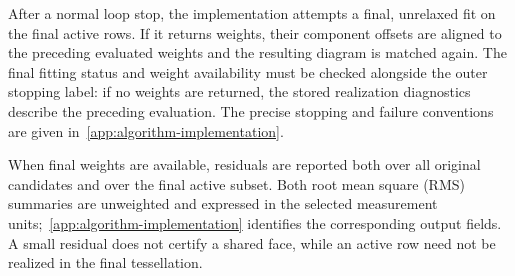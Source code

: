 After a normal loop stop, the implementation attempts a final, unrelaxed fit on the final active rows. If it returns weights, their component offsets are aligned to the preceding evaluated weights and the resulting diagram is matched again. The final fitting status and weight availability must be checked alongside the outer stopping label: if no weights are returned, the stored realization diagnostics describe the preceding evaluation. The precise stopping and failure conventions are given in~\ref{app:algorithm-implementation}.

When final weights are available, residuals are reported both over all original candidates and over the final active subset. Both root mean square (RMS) summaries are unweighted and expressed in the selected measurement units;~\ref{app:algorithm-implementation} identifies the corresponding output fields. A small residual does not certify a shared face, while an active row need not be realized in the final tessellation.

